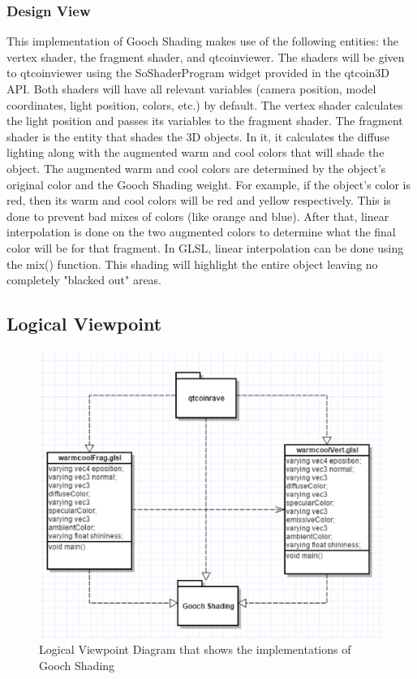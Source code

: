 \documentclass[10pt,journal,compsoc,draftclsnofoot]{IEEEtran}
\begin{document}
\begin{flushleft}
\subsubsection{Design View}
This implementation of Gooch Shading makes use of the following entities: the vertex shader, the fragment shader, and qtcoinviewer.
The shaders will be given to qtcoinviewer using the SoShaderProgram widget provided in the qtcoin3D API.
Both shaders will have all relevant variables (camera position, model coordinates, light position, colors, etc.) by default.
The vertex shader calculates the light position and passes its variables to the fragment shader.
The fragment shader is the entity that shades the 3D objects.
In it, it calculates the diffuse lighting along with the augmented warm and cool colors that will shade the object.
The augmented warm and cool colors are determined by the object's original color and the Gooch Shading weight.
For example, if the object's color is red, then its warm and cool colors will be red and yellow respectively.
This is done to prevent bad mixes of colors (like orange and blue).
After that, linear interpolation is done on the two augmented colors to determine what the final color will be for that fragment.
In GLSL, linear interpolation can be done using the mix() function.
This shading will highlight the entire object leaving no completely "blacked out" areas.

\newpage

\subsection{Logical Viewpoint}

\begin{figure} [H]
  \includegraphics[scale=0.8]{Gooch_Shading_composition.eps}
  \caption
{ \newline \hspace{\linewidth}
Logical Viewpoint Diagram that shows the implementations of Gooch Shading}
  \label{fig:Gooch_Shading_composition}
\end{figure}


\end{flushleft}
\end{document}

